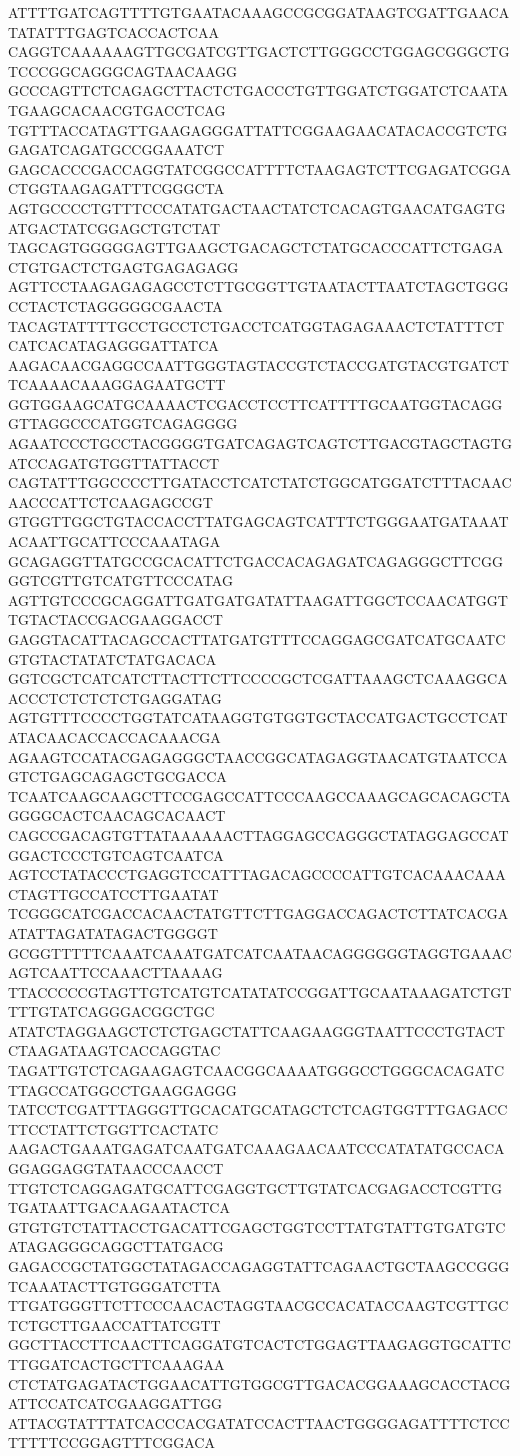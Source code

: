 ATTTTGATCAGTTTTGTGAATACAAAGCCGCGGATAAGTCGATTGAACATATATTTGAGTCACCACTCAA
CAGGTCAAAAAAGTTGCGATCGTTGACTCTTGGGCCTGGAGCGGGCTGTCCCGGCAGGGCAGTAACAAGG
GCCCAGTTCTCAGAGCTTACTCTGACCCTGTTGGATCTGGATCTCAATATGAAGCACAACGTGACCTCAG
TGTTTACCATAGTTGAAGAGGGATTATTCGGAAGAACATACACCGTCTGGAGATCAGATGCCGGAAATCT
GAGCACCCGACCAGGTATCGGCCATTTTCTAAGAGTCTTCGAGATCGGACTGGTAAGAGATTTCGGGCTA
AGTGCCCCTGTTTCCCATATGACTAACTATCTCACAGTGAACATGAGTGATGACTATCGGAGCTGTCTAT
TAGCAGTGGGGGAGTTGAAGCTGACAGCTCTATGCACCCATTCTGAGACTGTGACTCTGAGTGAGAGAGG
AGTTCCTAAGAGAGAGCCTCTTGCGGTTGTAATACTTAATCTAGCTGGGCCTACTCTAGGGGGCGAACTA
TACAGTATTTTGCCTGCCTCTGACCTCATGGTAGAGAAACTCTATTTCTCATCACATAGAGGGATTATCA
AAGACAACGAGGCCAATTGGGTAGTACCGTCTACCGATGTACGTGATCTTCAAAACAAAGGAGAATGCTT
GGTGGAAGCATGCAAAACTCGACCTCCTTCATTTTGCAATGGTACAGGGTTAGGCCCATGGTCAGAGGGG
AGAATCCCTGCCTACGGGGTGATCAGAGTCAGTCTTGACGTAGCTAGTGATCCAGATGTGGTTATTACCT
CAGTATTTGGCCCCTTGATACCTCATCTATCTGGCATGGATCTTTACAACAACCCATTCTCAAGAGCCGT
GTGGTTGGCTGTACCACCTTATGAGCAGTCATTTCTGGGAATGATAAATACAATTGCATTCCCAAATAGA
GCAGAGGTTATGCCGCACATTCTGACCACAGAGATCAGAGGGCTTCGGGGTCGTTGTCATGTTCCCATAG
AGTTGTCCCGCAGGATTGATGATGATATTAAGATTGGCTCCAACATGGTTGTACTACCGACGAAGGACCT
GAGGTACATTACAGCCACTTATGATGTTTCCAGGAGCGATCATGCAATCGTGTACTATATCTATGACACA
GGTCGCTCATCATCTTACTTCTTCCCCGCTCGATTAAAGCTCAAAGGCAACCCTCTCTCTCTGAGGATAG
AGTGTTTCCCCTGGTATCATAAGGTGTGGTGCTACCATGACTGCCTCATATACAACACCACCACAAACGA
AGAAGTCCATACGAGAGGGCTAACCGGCATAGAGGTAACATGTAATCCAGTCTGAGCAGAGCTGCGACCA
TCAATCAAGCAAGCTTCCGAGCCATTCCCAAGCCAAAGCAGCACAGCTAGGGGCACTCAACAGCACAACT
CAGCCGACAGTGTTATAAAAAACTTAGGAGCCAGGGCTATAGGAGCCATGGACTCCCTGTCAGTCAATCA
AGTCCTATACCCTGAGGTCCATTTAGACAGCCCCATTGTCACAAACAAACTAGTTGCCATCCTTGAATAT
TCGGGCATCGACCACAACTATGTTCTTGAGGACCAGACTCTTATCACGAATATTAGATATAGACTGGGGT
GCGGTTTTTCAAATCAAATGATCATCAATAACAGGGGGGTAGGTGAAACAGTCAATTCCAAACTTAAAAG
TTACCCCCGTAGTTGTCATGTCATATATCCGGATTGCAATAAAGATCTGTTTTGTATCAGGGACGGCTGC
ATATCTAGGAAGCTCTCTGAGCTATTCAAGAAGGGTAATTCCCTGTACTCTAAGATAAGTCACCAGGTAC
TAGATTGTCTCAGAAGAGTCAACGGCAAAATGGGCCTGGGCACAGATCTTAGCCATGGCCTGAAGGAGGG
TATCCTCGATTTAGGGTTGCACATGCATAGCTCTCAGTGGTTTGAGACCTTCCTATTCTGGTTCACTATC
AAGACTGAAATGAGATCAATGATCAAAGAACAATCCCATATATGCCACAGGAGGAGGTATAACCCAACCT
TTGTCTCAGGAGATGCATTCGAGGTGCTTGTATCACGAGACCTCGTTGTGATAATTGACAAGAATACTCA
GTGTGTCTATTACCTGACATTCGAGCTGGTCCTTATGTATTGTGATGTCATAGAGGGCAGGCTTATGACG
GAGACCGCTATGGCTATAGACCAGAGGTATTCAGAACTGCTAAGCCGGGTCAAATACTTGTGGGATCTTA
TTGATGGGTTCTTCCCAACACTAGGTAACGCCACATACCAAGTCGTTGCTCTGCTTGAACCATTATCGTT
GGCTTACCTTCAACTTCAGGATGTCACTCTGGAGTTAAGAGGTGCATTCTTGGATCACTGCTTCAAAGAA
CTCTATGAGATACTGGAACATTGTGGCGTTGACACGGAAAGCACCTACGATTCCATCATCGAAGGATTGG
ATTACGTATTTATCACCCACGATATCCACTTAACTGGGGAGATTTTCTCCTTTTTCCGGAGTTTCGGACA
